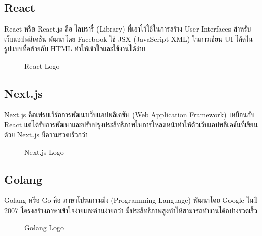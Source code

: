 

\subsection{React}

React หรือ React.js คือ ไลบรารี่ (Library) ที่เอาไว้ใช้ในการสร้าง User Interfaces สำหรับเว็บแอปพลิเคชัน พัฒนาโดย Facebook ใช้ JSX (JavaScript XML) ในการเขียน UI โค้ดในรูปแบบที่คล้ายกับ HTML ทำให้เข้าใจและใช้งานได้ง่าย \cite{ReadyToReactWithJSX}

\begin{figure}[H]
    \centering
    \caption{React Logo}
    \label{fig:react}
\end{figure}

\subsection{Next.js}

Next.js คือเฟรมเวิร์กการพัฒนาเว็บแอปพลิเคชัน (Web Application Framework) เหมือนกับ React แต่ได้รับการพัฒนาและปรับปรุงประสิทธิภาพในการโหลดหน้าทำให้ตัวเว็บแอปพลิเคชันที่เขียนด้วย Next.js มีความรวดเร็วกว่า \cite{WhatIsNextjs}

\begin{figure}[H]
    \centering
    \caption{Next.js Logo}
    \label{fig:nextjs}
\end{figure}

\newpage

\subsection{Golang}

Golang หรือ Go คือ ภาษาโปรแกรมมิ่ง (Programming Language) พัฒนาโดย Google ในปี 2007 โครงสร้างภาษาเข้าใจง่ายและอ่านง่ายกว่า มีประสิทธิภาพสูงทำให้สามารถทำงานได้อย่างรวดเร็ว \cite{WhatIsGolang}

\begin{figure}[H]
    \centering
    \caption{Golang Logo}
    \label{fig:golang}
\end{figure}

